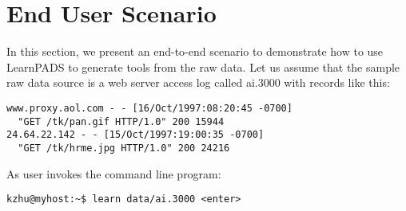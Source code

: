\documentclass{sig-alternate-sigmod08}
\begin{document}


\section{End User Scenario}
In this section, we present an end-to-end scenario to demonstrate how
to use LearnPADS to generate tools from the raw data.
Let us assume that the sample raw data source is a web server access log
called ai.3000 with records like this:

{\small
\begin{verbatim}
www.proxy.aol.com - - [16/Oct/1997:08:20:45 -0700] 
  "GET /tk/pan.gif HTTP/1.0" 200 15944
24.64.22.142 - - [15/Oct/1997:19:00:35 -0700] 
  "GET /tk/hrme.jpg HTTP/1.0" 200 24216
\end{verbatim}
}

As user invokes the command line program:

{\small
\begin{verbatim}
kzhu@myhost:~$ learn data/ai.3000 <enter>
\end{verbatim}
}
\end{document}
